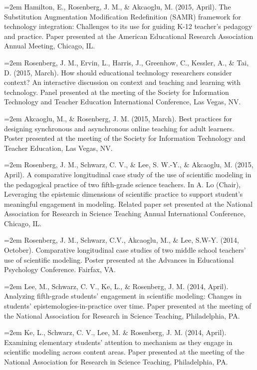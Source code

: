 \documentclass[]{article}
\begin{document}
\hangindent=2em Hamilton, E., Rosenberg, J. M., \& Akcaoglu, M. (2015,
April). The Substitution Augmentation Modification Redefinition (SAMR)
framework for technology integration: Challenges to its use for guiding
K-12 teacher's pedagogy and practice. Paper presented at the American
Educational Research Association Annual Meeting, Chicago, IL.

\hangindent=2em Rosenberg, J. M., Ervin, L., Harris, J., Greenhow, C.,
Kessler, A., \& Tai, D. (2015, March). How should educational technology
researchers consider context? An interactive discussion on context and
teaching and learning with technology. Panel presented at the meeting of
the Society for Information Technology and Teacher Education
International Conference, Las Vegas, NV.

\hangindent=2em Akcaoglu, M., \& Rosenberg, J. M. (2015, March). Best
practices for designing synchronous and asynchronous online teaching for
adult learners. Poster presented at the meeting of the Society for
Information Technology and Teacher Education, Las Vegas, NV.

\hangindent=2em Rosenberg, J. M., Schwarz, C. V., \& Lee, S. W.-Y., \&
Akcaoglu, M. (2015, April). A comparative longitudinal case study of the
use of scientific modeling in the pedagogical practice of two
fifth-grade science teachers. In A. Lo (Chair), Leveraging the epistemic
dimensions of scientific practice to support student's meaningful
engagement in modeling. Related paper set presented at the National
Association for Research in Science Teaching Annual International
Conference, Chicago, IL.

\hangindent=2em Rosenberg, J. M., Schwarz, C.V., Akcaoglu, M., \& Lee,
S.W-Y. (2014, October). Comparative longitudinal case studies of two
middle school teachers' use of scientific modeling. Poster presented at
the Advances in Educational Psychology Conference. Fairfax, VA.

\hangindent=2em Lee, M., Schwarz, C. V., Ke, L., \& Rosenberg, J. M.
(2014, April). Analyzing fifth-grade students' engagement in scientific
modeling: Changes in students' epistemologies-in-practice over time.
Paper presented at the meeting of the National Association for Research
in Science Teaching, Philadelphia, PA.

\hangindent=2em Ke, L., Schwarz, C. V., Lee, M. \& Rosenberg, J. M.
(2014, April). Examining elementary students' attention to mechanism as
they engage in scientific modeling across content areas. Paper presented
at the meeting of the National Association for Research in Science
Teaching, Philadelphia, PA.
\end{document}
